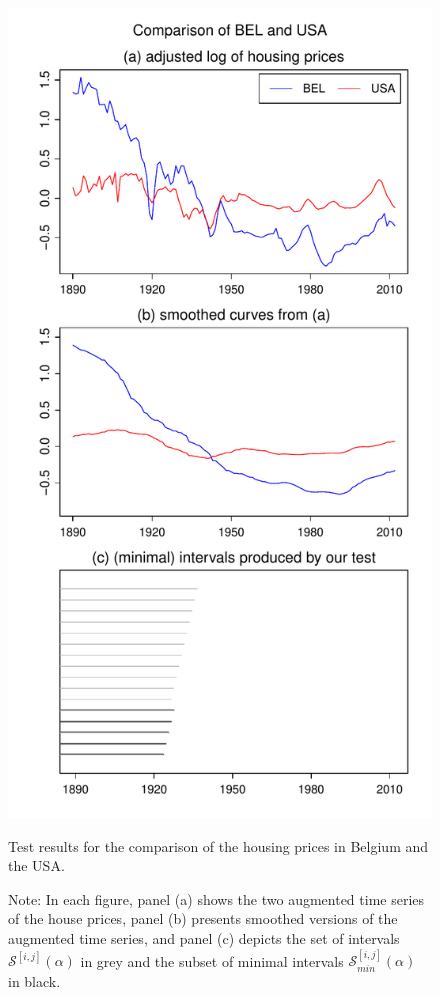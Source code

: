 \documentclass[a4paper,12pt]{article}
\begin{document}
\begin{figure}[t!]
\hspace{0.25cm}
\begin{minipage}[t]{0.49\textwidth}
\includegraphics[width=\textwidth]{Plots/hp_BEL_vs_USA}
\caption{Test results for the comparison of the housing prices in Belgium and the USA.}\label{fig:hp:Belgium:USA}
\end{minipage}
\caption*{Note: In each figure, panel (a) shows the two augmented time series of the house prices, panel (b) presents smoothed versions of the augmented time series, and panel (c) depicts the set of intervals $\mathcal{S}^{[i,j]}(\alpha)$ in grey and the subset of minimal intervals $\mathcal{S}^{[i,j]}_{min}(\alpha)$ in black.}
\end{figure}
\end{document}
